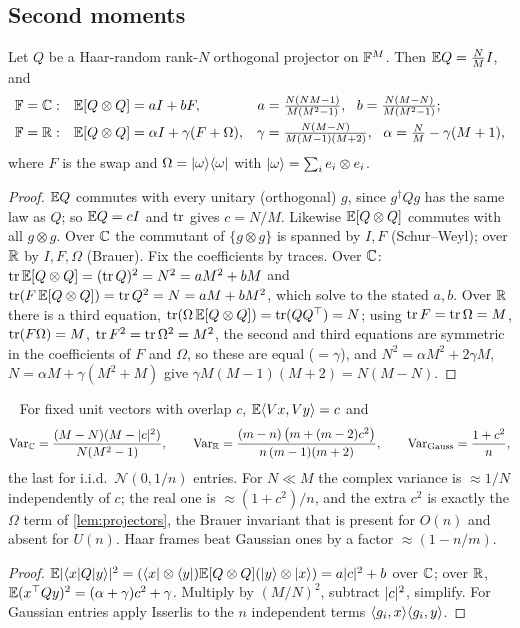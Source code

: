 \subsection{Second moments}
\begin{lemma}\label{lem:projectors}\proved
Let $Q$ be a Haar-random rank-$N$ orthogonal projector on $\mathbb F^M$. Then $\mathbb E Q=\frac NM I$, and
\begin{align*}
\mathbb F=\mathbb C:&\quad \mathbb E[Q\otimes Q]=aI+bF, & a&=\tfrac{N(NM-1)}{M(M^2-1)},\ \ b=\tfrac{N(M-N)}{M(M^2-1)};\\
\mathbb F=\mathbb R:&\quad \mathbb E[Q\otimes Q]=\alpha I+\gamma(F+\Omega), & \gamma&=\tfrac{N(M-N)}{M(M-1)(M+2)},\ \ \alpha=\tfrac NM-\gamma(M+1),
\end{align*}
where $F$ is the swap and $\Omega=|\omega\rangle\langle \omega|$ with $|\omega\rangle=\sum_ie_i\otimes e_i$.
\end{lemma}
\begin{proof}
$\mathbb E Q$ commutes with every unitary (orthogonal) $g$, since $g^\dagger Qg$ has the same law as $Q$; so $\mathbb E Q=cI$ and
$\operatorname{tr}$ gives $c=N/M$. Likewise $\mathbb E[Q\otimes Q]$ commutes with all $g\otimes g$. Over $\mathbb C$ the commutant of
$\{g\otimes g\}$ is spanned by $I,F$ (Schur--Weyl); over $\mathbb R$ by $I,F,\Omega$ (Brauer). Fix the coefficients by
traces. Over $\mathbb C$: $\operatorname{tr}\mathbb E[Q\otimes Q]=(\operatorname{tr} Q)^2=N^2=aM^2+bM$ and $\operatorname{tr}(F\,\mathbb E[Q\otimes Q])=\operatorname{tr} Q^2=N=aM+bM^2$, which
solve to the stated $a,b$. Over $\mathbb R$ there is a third equation, $\operatorname{tr}(\Omega\,\mathbb E[Q\otimes Q])=\operatorname{tr}(QQ^\top)=N$; using
$\operatorname{tr} F=\operatorname{tr}\Omega=M$, $\operatorname{tr}(F\Omega)=M$, $\operatorname{tr} F^2=\operatorname{tr}\Omega^2=M^2$, the second and third equations are symmetric in the
coefficients of $F$ and $\Omega$, so these are equal ($=\gamma$), and $N^2=\alpha M^2+2\gamma M$,
$N=\alpha M+\gamma(M^2+M)$ give $\gamma M(M-1)(M+2)=N(M-N)$.
\end{proof}

\begin{proposition}\label{prop:variances}\proved\ \numchk
For fixed unit vectors with overlap $c$, $\mathbb E\langle Vx,Vy\rangle=c$ and
\[
\operatorname{Var}_{\mathbb C}=\frac{(M-N)(M-\lvert c\rvert^2)}{N(M^2-1)},\qquad
\operatorname{Var}_{\mathbb R}=\frac{(m-n)\,\big(m+(m-2)c^2\big)}{n\,(m-1)(m+2)},\qquad
\operatorname{Var}_{\rm Gauss}=\frac{1+c^2}{n},
\]
the last for i.i.d.\ $\mathcal N(0,1/n)$ entries. For $N\ll M$ the complex variance is $\approx1/N$ independently of
$c$; the real one is $\approx(1+c^2)/n$, and the extra $c^2$ is exactly the $\Omega$ term of \cref{lem:projectors},
the Brauer invariant that is present for $O(n)$ and absent for $U(n)$. Haar frames beat Gaussian ones by a factor
$\approx(1-n/m)$.
\end{proposition}
\begin{proof}
$\mathbb E\lvert \langle x| Q|y\rangle\rvert^2=(\langle x|\otimes\langle y|)\mathbb E[Q\otimes Q](|y\rangle\otimes|x\rangle)=a\lvert c\rvert^2+b$ over $\mathbb C$; over $\mathbb R$,
$\mathbb E(x^\top Qy)^2=(\alpha+\gamma)c^2+\gamma$. Multiply by $(M/N)^2$, subtract $\lvert c\rvert^2$, simplify. For Gaussian
entries apply Isserlis to the $n$ independent terms $\langle g_i,x\rangle\langle g_i,y\rangle$.
\end{proof}

